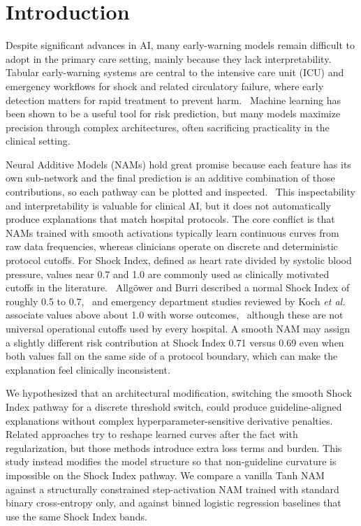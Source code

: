 \documentclass[conference]{IEEEtran}
\begin{document}
\section{Introduction}
Despite significant advances in AI, many early-warning models remain difficult to adopt in the primary care setting, mainly because they lack interpretability.~\cite{rudin2019} Tabular early-warning systems are central to the intensive care unit (ICU) and emergency workflows for shock and related circulatory failure, where early detection matters for rapid treatment to prevent harm.~\cite{allgower1967,koch2019} Machine learning has been shown to be a useful tool for risk prediction, but many models maximize precision through complex architectures, often sacrificing practicality in the clinical setting.

Neural Additive Models (NAMs) hold great promise because each feature has its own sub-network and the final prediction is an additive combination of those contributions, so each pathway can be plotted and inspected.~\cite{agarwal2021} This inspectability and interpretability is valuable for clinical AI, but it does not automatically produce explanations that match hospital protocols. The core conflict is that NAMs trained with smooth activations typically learn continuous curves from raw data frequencies, whereas clinicians operate on discrete and deterministic protocol cutoffs. For Shock Index, defined as heart rate divided by systolic blood pressure, values near 0.7 and 1.0 are commonly used as clinically motivated cutoffs in the literature.~\cite{allgower1967,koch2019} Allg\"{o}wer and Burri described a normal Shock Index of roughly 0.5 to 0.7,~\cite{allgower1967} and emergency department studies reviewed by Koch \textit{et al.} associate values above about 1.0 with worse outcomes,~\cite{koch2019} although these are not universal operational cutoffs used by every hospital. A smooth NAM may assign a slightly different risk contribution at Shock Index 0.71 versus 0.69 even when both values fall on the same side of a protocol boundary, which can make the explanation feel clinically inconsistent.

We hypothesized that an architectural modification, switching the smooth Shock Index pathway for a discrete threshold switch, could produce guideline-aligned explanations without complex hyperparameter-sensitive derivative penalties. Related approaches try to reshape learned curves after the fact with regularization, but those methods introduce extra loss terms and burden. This study instead modifies the model structure so that non-guideline curvature is impossible on the Shock Index pathway. We compare a vanilla Tanh NAM against a structurally constrained step-activation NAM trained with standard binary cross-entropy only, and against binned logistic regression baselines that use the same Shock Index bands.
\end{document}
